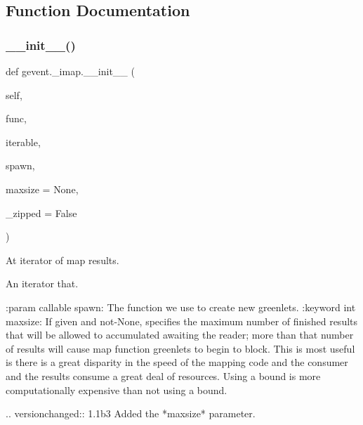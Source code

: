 \subsection{Function Documentation}
\mbox{\label{namespacegevent_1_1__imap_a23ed08242c1a42c9b63c3158b16ca39d}} 
\subsubsection{\texorpdfstring{\+\_\+\+\_\+init\+\_\+\+\_\+()}{\_\_init\_\_()}}
{\footnotesize\ttfamily def gevent.\+\_\+imap.\+\_\+\+\_\+init\+\_\+\+\_\+ (\begin{DoxyParamCaption}\item[{}]{self,  }\item[{}]{func,  }\item[{}]{iterable,  }\item[{}]{spawn,  }\item[{}]{maxsize = {\ttfamily None},  }\item[{}]{\+\_\+zipped = {\ttfamily False} }\end{DoxyParamCaption})}

\begin{DoxyVerb}At iterator of map results.
\end{DoxyVerb}
\begin{DoxyVerb}An iterator that.

:param callable spawn: The function we use to create new greenlets.
:keyword int maxsize: If given and not-None, specifies the maximum number of
    finished results that will be allowed to accumulated awaiting the reader;
    more than that number of results will cause map function greenlets to begin
    to block. This is most useful is there is a great disparity in the speed of
    the mapping code and the consumer and the results consume a great deal of resources.
    Using a bound is more computationally expensive than not using a bound.

.. versionchanged:: 1.1b3
    Added the *maxsize* parameter.
\end{DoxyVerb}
 \mbox{\label{namespacegevent_1_1__imap_aa5389dec98803ddefb976f4bed762064}} 

